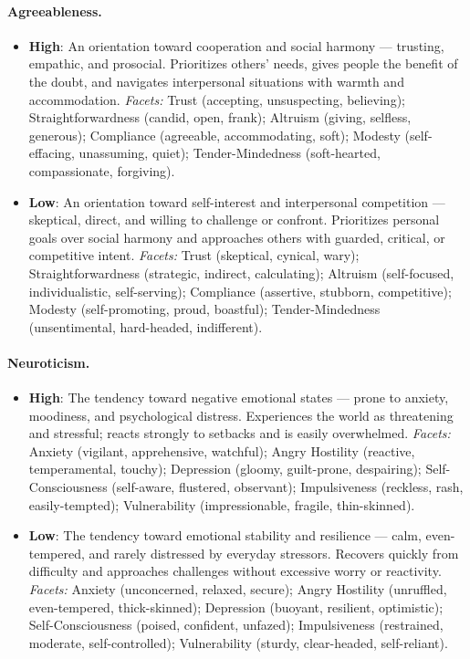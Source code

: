 \paragraph{Agreeableness.}
\begin{itemize}
  \item \textbf{High}: An orientation toward cooperation and social harmony --- trusting, empathic, and prosocial. Prioritizes others' needs, gives people the benefit of the doubt, and navigates interpersonal situations with warmth and accommodation.
    \emph{Facets:} Trust (accepting, unsuspecting, believing); Straightforwardness (candid, open, frank); Altruism (giving, selfless, generous); Compliance (agreeable, accommodating, soft); Modesty (self-effacing, unassuming, quiet); Tender-Mindedness (soft-hearted, compassionate, forgiving).
  \item \textbf{Low}: An orientation toward self-interest and interpersonal competition --- skeptical, direct, and willing to challenge or confront. Prioritizes personal goals over social harmony and approaches others with guarded, critical, or competitive intent.
    \emph{Facets:} Trust (skeptical, cynical, wary); Straightforwardness (strategic, indirect, calculating); Altruism (self-focused, individualistic, self-serving); Compliance (assertive, stubborn, competitive); Modesty (self-promoting, proud, boastful); Tender-Mindedness (unsentimental, hard-headed, indifferent).
\end{itemize}

\paragraph{Neuroticism.}
\begin{itemize}
  \item \textbf{High}: The tendency toward negative emotional states --- prone to anxiety, moodiness, and psychological distress. Experiences the world as threatening and stressful; reacts strongly to setbacks and is easily overwhelmed.
    \emph{Facets:} Anxiety (vigilant, apprehensive, watchful); Angry Hostility (reactive, temperamental, touchy); Depression (gloomy, guilt-prone, despairing); Self-Consciousness (self-aware, flustered, observant); Impulsiveness (reckless, rash, easily-tempted); Vulnerability (impressionable, fragile, thin-skinned).
  \item \textbf{Low}: The tendency toward emotional stability and resilience --- calm, even-tempered, and rarely distressed by everyday stressors. Recovers quickly from difficulty and approaches challenges without excessive worry or reactivity.
    \emph{Facets:} Anxiety (unconcerned, relaxed, secure); Angry Hostility (unruffled, even-tempered, thick-skinned); Depression (buoyant, resilient, optimistic); Self-Consciousness (poised, confident, unfazed); Impulsiveness (restrained, moderate, self-controlled); Vulnerability (sturdy, clear-headed, self-reliant).
\end{itemize}

